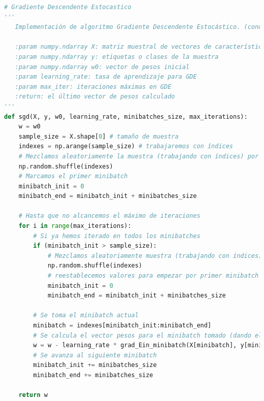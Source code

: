 \documentclass[11pt,a4paper]{article}
\theoremstyle{definition}
\begin{document}
			\begin{lstlisting}[language=Python, caption= Implementaci\'on del m\'etodo por SGD en Python, inputencoding=latin1]
  # Gradiente Descendente Estocastico
'''
   Implementación de algoritmo Gradiente Descendente Estocástico. (condición de parada por iteraciones)
   
   :param numpy.ndarray X: matriz muestral de vectores de características
   :param numpy.ndarray y: etiquetas o clases de la muestra
   :param numpy.ndarray w0: vector de pesos inicial
   :param learning_rate: tasa de aprendizaje para GDE
   :param max_iter: iteraciones máximas en GDE
   :return: el último vector de pesos calculado
'''
def sgd(X, y, w0, learning_rate, minibatches_size, max_iterations):
    w = w0 
    sample_size = X.shape[0] # tamaño de muestra
    indexes = np.arange(sample_size) # trabajaremos con índices
    # Mezclamos aleatoriamente la muestra (trabajando con índices) por primera vez
    np.random.shuffle(indexes)
    # Marcamos el primer minibatch
    minibatch_init = 0
    minibatch_end = minibatch_init + minibatches_size
    
    # Hasta que no alcancemos el máximo de iteraciones
    for i in range(max_iterations):
        # Si ya hemos iterado en todos los minibatches
        if (minibatch_init > sample_size):
            # Mezclamos aleatoriamente muestra (trabajando con índices), generando así nuevos minibatches
            np.random.shuffle(indexes)
            # reestablecemos valores para empezar por primer minibatch
            minibatch_init = 0
            minibatch_end = minibatch_init + minibatches_size
        
        # Se toma el minibatch actual
        minibatch = indexes[minibatch_init:minibatch_end]
        # Se calcula el vector pesos para el minibatch tomado (dando el 'paso de mayor profundidad' en el minibatch)
        w = w - learning_rate * grad_Ein_minibatch(X[minibatch], y[minibatch], w)
        # Se avanza al siguiente minibatch
        minibatch_init += minibatches_size
        minibatch_end += minibatches_size
        
    return w
	\end{lstlisting}~\\
	
\end{document}
